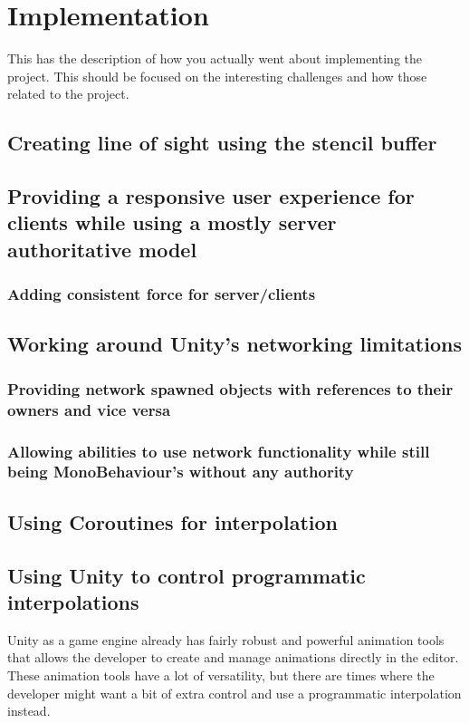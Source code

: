 \chapter{Implementation}
\label{chap:implementation}
This has the description of how you actually went about implementing the project.  This should be focused on the interesting challenges and how those related to the project.

\section{Creating line of sight using the stencil buffer}

\section{Providing a responsive user experience for clients while using a mostly server authoritative model}
\subsection{Adding consistent force for server/clients}

\section{Working around Unity's networking limitations}
\subsection{Providing network spawned objects with references to their owners and vice versa}
\subsection{Allowing abilities to use network functionality while still being MonoBehaviour's without any authority}

\section{Using Coroutines for interpolation}

\section{Using Unity to control programmatic interpolations}
\label{sec:boomerangCurve}
Unity as a game engine already has fairly robust and powerful animation tools that allows the developer to create and manage animations directly in the editor. These animation tools have a lot of versatility, but there are times where the developer might want a bit of extra control and use a programmatic interpolation instead. 

